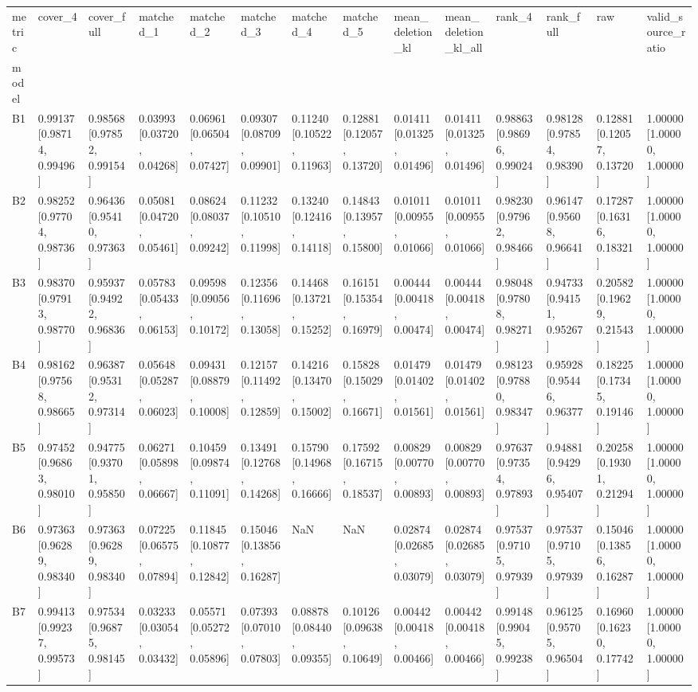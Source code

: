 \begin{tabular}{llllllllllllll}
\toprule
metric & cover_4 & cover_full & matched_1 & matched_2 & matched_3 & matched_4 & matched_5 & mean_deletion_kl & mean_deletion_kl_all & rank_4 & rank_full & raw & valid_source_ratio \\
model &  &  &  &  &  &  &  &  &  &  &  &  &  \\
\midrule
B1 & 0.99137 [0.98714, 0.99496] & 0.98568 [0.97852, 0.99154] & 0.03993 [0.03720, 0.04268] & 0.06961 [0.06504, 0.07427] & 0.09307 [0.08709, 0.09901] & 0.11240 [0.10522, 0.11963] & 0.12881 [0.12057, 0.13720] & 0.01411 [0.01325, 0.01496] & 0.01411 [0.01325, 0.01496] & 0.98863 [0.98696, 0.99024] & 0.98128 [0.97854, 0.98390] & 0.12881 [0.12057, 0.13720] & 1.00000 [1.00000, 1.00000] \\
B2 & 0.98252 [0.97704, 0.98736] & 0.96436 [0.95410, 0.97363] & 0.05081 [0.04720, 0.05461] & 0.08624 [0.08037, 0.09242] & 0.11232 [0.10510, 0.11998] & 0.13240 [0.12416, 0.14118] & 0.14843 [0.13957, 0.15800] & 0.01011 [0.00955, 0.01066] & 0.01011 [0.00955, 0.01066] & 0.98230 [0.97962, 0.98466] & 0.96147 [0.95608, 0.96641] & 0.17287 [0.16316, 0.18321] & 1.00000 [1.00000, 1.00000] \\
B3 & 0.98370 [0.97913, 0.98770] & 0.95937 [0.94922, 0.96836] & 0.05783 [0.05433, 0.06153] & 0.09598 [0.09056, 0.10172] & 0.12356 [0.11696, 0.13058] & 0.14468 [0.13721, 0.15252] & 0.16151 [0.15354, 0.16979] & 0.00444 [0.00418, 0.00474] & 0.00444 [0.00418, 0.00474] & 0.98048 [0.97808, 0.98271] & 0.94733 [0.94151, 0.95267] & 0.20582 [0.19629, 0.21543] & 1.00000 [1.00000, 1.00000] \\
B4 & 0.98162 [0.97568, 0.98665] & 0.96387 [0.95312, 0.97314] & 0.05648 [0.05287, 0.06023] & 0.09431 [0.08879, 0.10008] & 0.12157 [0.11492, 0.12859] & 0.14216 [0.13470, 0.15002] & 0.15828 [0.15029, 0.16671] & 0.01479 [0.01402, 0.01561] & 0.01479 [0.01402, 0.01561] & 0.98123 [0.97880, 0.98347] & 0.95928 [0.95446, 0.96377] & 0.18225 [0.17345, 0.19146] & 1.00000 [1.00000, 1.00000] \\
B5 & 0.97452 [0.96863, 0.98010] & 0.94775 [0.93701, 0.95850] & 0.06271 [0.05898, 0.06667] & 0.10459 [0.09874, 0.11091] & 0.13491 [0.12768, 0.14268] & 0.15790 [0.14968, 0.16666] & 0.17592 [0.16715, 0.18537] & 0.00829 [0.00770, 0.00893] & 0.00829 [0.00770, 0.00893] & 0.97637 [0.97354, 0.97893] & 0.94881 [0.94296, 0.95407] & 0.20258 [0.19301, 0.21294] & 1.00000 [1.00000, 1.00000] \\
B6 & 0.97363 [0.96289, 0.98340] & 0.97363 [0.96289, 0.98340] & 0.07225 [0.06575, 0.07894] & 0.11845 [0.10877, 0.12842] & 0.15046 [0.13856, 0.16287] & NaN & NaN & 0.02874 [0.02685, 0.03079] & 0.02874 [0.02685, 0.03079] & 0.97537 [0.97105, 0.97939] & 0.97537 [0.97105, 0.97939] & 0.15046 [0.13856, 0.16287] & 1.00000 [1.00000, 1.00000] \\
B7 & 0.99413 [0.99237, 0.99573] & 0.97534 [0.96875, 0.98145] & 0.03233 [0.03054, 0.03432] & 0.05571 [0.05272, 0.05896] & 0.07393 [0.07010, 0.07803] & 0.08878 [0.08440, 0.09355] & 0.10126 [0.09638, 0.10649] & 0.00442 [0.00418, 0.00466] & 0.00442 [0.00418, 0.00466] & 0.99148 [0.99045, 0.99238] & 0.96125 [0.95705, 0.96504] & 0.16960 [0.16230, 0.17742] & 1.00000 [1.00000, 1.00000] \\
\bottomrule
\end{tabular}
